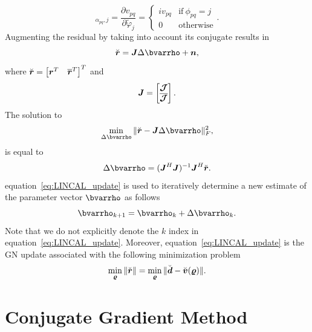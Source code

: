 \documentclass[useAMS,usenatbib]{mn2e}
\newcommand{\br}{\bmath{r}}
\newcommand{\bd}{\bmath{d}}
\newcommand{\bv}{\bmath{v}}
\newcommand{\bn}{\bmath{n}}
\newcommand{\bJ}{\bmath{J}}
\newcommand{\bR}{\bmath{R}}
\newcommand{\bmJ}{\bmath{\mathcal{J}}}
\newcommand{\conj}[1]{\overline{#1}}
\begin{document}
\begin{equation}
 [\bR]_{\alpha_{pq},j} =  \frac{\partial v_{pq}}{\partial \widetilde{\varphi}_j} = \begin{cases} 
    i v_{pq} &\textrm{if}~\phi_{pq}=j\\
    0 & \textrm{otherwise}
   \end{cases}.
\end{equation}
Augmenting the residual by taking into account its conjugate results in 
\begin{equation}
\breve{\br} = \bJ \Delta \bvarrho + \bn, 
\end{equation}
where $\breve{\br} = \begin{bmatrix}\br^T & \conj{\br}^T \end{bmatrix}^T$ and 
\begin{equation}
\label{eq:Jac_lin}
\bJ = 
\begin{bmatrix}
 \bmJ\\  
 \conj{\bmJ}
\end{bmatrix}.
\end{equation}
The solution to 
\begin{equation}
 \min_{\Delta \bvarrho} \| \breve{\br} - \bJ \Delta \bvarrho\|_F^2,
\end{equation}
is equal to 
\begin{equation}
\label{eq:LINCAL_update}
\Delta \bvarrho = (\bJ^H\bJ)^{-1} \bJ^H\breve{\br}. 
\end{equation}
equation~\ref{eq:LINCAL_update} is used to iteratively determine a new estimate of the parameter vector $\bvarrho$ as follows
\begin{equation}
\label{eq:new_rho}
\bvarrho_{k+1} = \bvarrho_k + \Delta \bvarrho_k. 
\end{equation}
Note that we do not explicitly denote the $k$ index in equation~\ref{eq:LINCAL_update}.
Moreover, equation~\ref{eq:LINCAL_update} is the GN update associated with the following minimization problem \citep{Kurien2016}
\begin{equation}
\label{eq:least_squares_lincal}
\min_{\bmath{\varrho}} \|\breve{\br}\| = \min_{\bmath{\varrho}} \|\breve{\bd} - \breve{\bv}(\bmath{\varrho})\|.
\end{equation}

\section{Conjugate Gradient Method}
\end{document}
